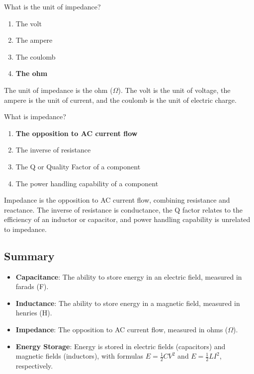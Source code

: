 
\begin{tcolorbox}[colback=gray!10!white,colframe=black!75!black,title={T5C05}]
    What is the unit of impedance?
    \begin{enumerate}[label=\Alph*),noitemsep]
        \item The volt
        \item The ampere
        \item The coulomb
        \item \textbf{The ohm}
    \end{enumerate}
\end{tcolorbox}
The unit of impedance is the ohm (\(\Omega\)). The volt is the unit of voltage, the ampere is the unit of current, and the coulomb is the unit of electric charge.


\begin{tcolorbox}[colback=gray!10!white,colframe=black!75!black,title={T5C12}]
    What is impedance?
    \begin{enumerate}[label=\Alph*),noitemsep]
        \item \textbf{The opposition to AC current flow}
        \item The inverse of resistance
        \item The Q or Quality Factor of a component
        \item The power handling capability of a component
    \end{enumerate}
\end{tcolorbox}
Impedance is the opposition to AC current flow, combining resistance and reactance. The inverse of resistance is conductance, the Q factor relates to the efficiency of an inductor or capacitor, and power handling capability is unrelated to impedance.


\subsection*{Summary}
\begin{itemize}
    \item \textbf{Capacitance}: The ability to store energy in an electric field, measured in farads (F).
    \item \textbf{Inductance}: The ability to store energy in a magnetic field, measured in henries (H).
    \item \textbf{Impedance}: The opposition to AC current flow, measured in ohms (\(\Omega\)).
    \item \textbf{Energy Storage}: Energy is stored in electric fields (capacitors) and magnetic fields (inductors), with formulas \( E = \frac{1}{2}CV^2 \) and \( E = \frac{1}{2}LI^2 \), respectively.
\end{itemize}
